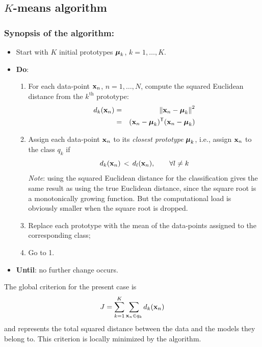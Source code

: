 \documentclass[a4paper]{article}
\newcommand{\trn}{^{\mathsf T}} %
\newcommand{\xv}{\ensuremath\mathbf{x}}  %
\newcommand{\muv}{\ensuremath\boldsymbol{\mu}}  %
\newcommand{\Sm}{\ensuremath\boldsymbol{\Sigma}}  %
\begin{document}
\subsection{$K$-means algorithm}
\subsubsection*{Synopsis of the algorithm:}
\begin{itemize}
\item Start with $K$ initial prototypes $\muv_k$, $k=1,\ldots,K$.
\item {\bf Do}:
  \begin{enumerate}
  \item For each data-point $\xv_n$, $n=1,\ldots,N$, compute the squared
    Euclidean distance from the $k^{\text{th}}$ prototype:
    \begin{eqnarray}
      \label{eq:dist}
      d_k(\xv_n) & = & \, \left\| \xv_n - \muv_k \right\|^2 \nonumber \\
      & = & (\xv_n-\muv_k)\trn(\xv_n-\muv_k)   \nonumber
    \end{eqnarray}
  \item Assign each data-point $\xv_n$ to its \emph{closest prototype}
    $\muv_k$, i.e., assign $\xv_n$ to the class $q_k$ if
    \[
    d_k(\xv_n) \, < \, d_l(\xv_n), \qquad \forall l \neq k
    \]
    {\em Note}: using the squared Euclidean distance for the
    classification gives the same result as using the true Euclidean
    distance, since the square root is a monotonically growing
    function. But the computational load is obviously smaller when the
    square root is dropped.
\item Replace each prototype with the mean of the data-points assigned to
  the corresponding class;
\item Go to 1.
\end{enumerate}

\item {\bf Until}: no further change occurs.
\end{itemize}

The global criterion for the present case is
\[
    J = \sum_{k=1}^{K} \sum_{\xv_n \in q_k} d_k(\xv_n)
\]
and represents the total squared distance between the data and the models
they belong to. This criterion is locally minimized by the algorithm.

\end{document}
